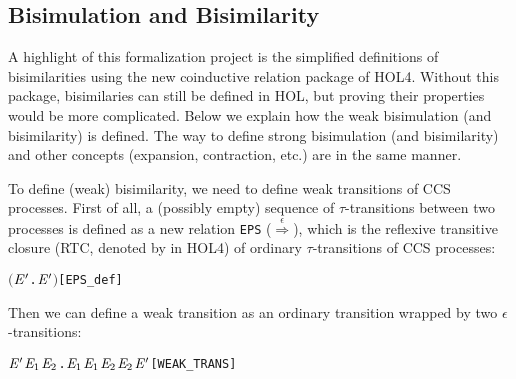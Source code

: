 
\subsection{Bisimulation and Bisimilarity}
\label{ss:bb}

A highlight of this formalization project is the simplified definitions of
  bisimilarities using the new coinductive relation package of
  HOL4. Without this package, bisimilaries can still be defined in HOL, but
  proving their properties would be more complicated. Below we explain
  how the weak bisimulation (and bisimilarity) is defined. The way to
  define strong bisimulation (and bisimilarity) and other concepts
  (expansion, contraction, etc.) are in the same manner.

To define (weak) bisimilarity, we need to define weak transitions of CCS processes. 
First of all, a (possibly empty) sequence of $\tau$-transitions between
two processes is defined as a new relation \texttt{EPS}
($\overset{\epsilon}{\Longrightarrow}$), which is the
reflexive transitive closure (RTC, denoted by \mbox{\color{blue}{$^*$}} in
HOL4) of ordinary $\tau$-transitions of CCS processes:
\begin{alltt}
 \HOLTokenDefEquality{} \ensuremath{(}\HOLTokenLambda{} \ensuremath{\HOLBoundVar{E}\sp{\prime}}.  \HOLTokenTransBegin\HOLSymConst{\ensuremath{\tau}}\HOLTokenTransEnd \ensuremath{\HOLBoundVar{E}\sp{\prime}}\ensuremath{)}\HOLSymConst{\HOLTokenSupStar{}}\hfill{[EPS_def]}
\end{alltt}
Then we can define a weak transition as an ordinary transition wrapped by
two $\epsilon$-transitions:
\begin{alltt}
 \HOLTokenWeakTransBegin{}\HOLTokenWeakTransEnd \ensuremath{\HOLFreeVar{E}\sp{\prime}} \HOLTokenDefEquality{} \HOLSymConst{\HOLTokenExists{}}\ensuremath{\HOLBoundVar{E}\sb{\mathrm{1}}} \ensuremath{\HOLBoundVar{E}\sb{\mathrm{2}}}.  \HOLSymConst{\HOLTokenEPS} \ensuremath{\HOLBoundVar{E}\sb{\mathrm{1}}} \HOLSymConst{\HOLTokenConj{}} \ensuremath{\HOLBoundVar{E}\sb{\mathrm{1}}} \HOLTokenTransBegin{}\HOLTokenTransEnd \ensuremath{\HOLBoundVar{E}\sb{\mathrm{2}}} \HOLSymConst{\HOLTokenConj{}} \ensuremath{\HOLBoundVar{E}\sb{\mathrm{2}}} \HOLSymConst{\HOLTokenEPS} \ensuremath{\HOLFreeVar{E}\sp{\prime}}\hfill{[WEAK_TRANS]}
\end{alltt}

